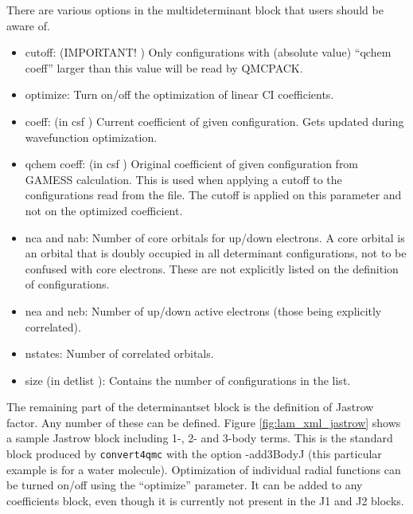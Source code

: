 {There are various options in the multideterminant block that users should be aware of.
\begin{itemize}
  \item{cutoff: (IMPORTANT! ) Only configurations with (absolute value) “qchem coeff”
larger than this value will be read by QMCPACK.}
  \item{optimize: Turn on/off the optimization of linear CI coefficients.}
  \item{coeff: (in csf ) Current coefficient of given configuration. Gets updated during 
wavefunction optimization.}
  \item{qchem coeff: (in csf ) Original coefficient of given configuration from GAMESS 
calculation. This is used when applying a cutoff to the configurations read from the file.
The cutoff is applied on this parameter and not on the optimized coefficient.}
  \item{nca and nab: Number of core orbitals for up/down electrons. A core orbital is an
orbital that is doubly occupied in all determinant configurations, not to be confused
with core electrons. These are not explicitly listed on the definition of configurations.}
  \item{nea and neb: Number of up/down active electrons (those being explicitly correlated).}
  \item{nstates: Number of correlated orbitals}.
  \item{size (in detlist ): Contains the number of configurations in the list.}
\end{itemize}
The remaining part of the determinantset block is the definition of Jastrow factor. Any
number of these can be defined. Figure \ref{fig:lam_xml_jastrow} shows a sample Jastrow 
block including 1-, 2- and 3-body terms. This is the standard block produced by 
\texttt{convert4qmc} with the option -add3BodyJ (this particular example is for a water molecule). 
Optimization of individual radial functions can be turned on/off using the “optimize” 
parameter. It can be added to any coefficients block, even though it is currently not 
present in the J1 and J2 blocks.

}
